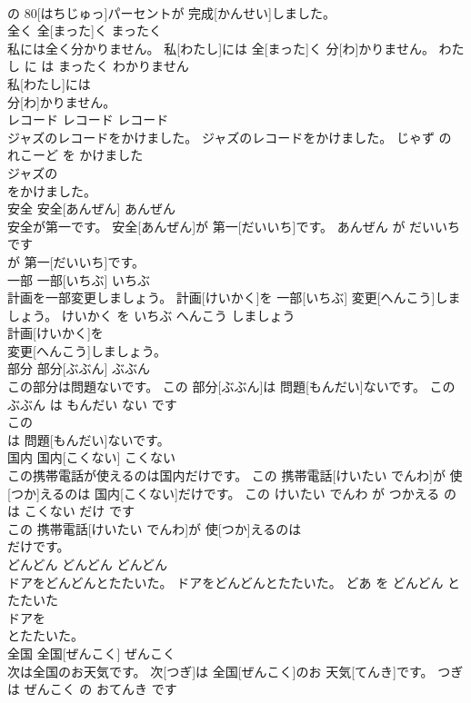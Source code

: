 \documentclass[8pt]{extreport}
\begin{document}
\begin{CJK}{UTF8}{min}
\\	の 80[はちじゅっ]パーセントが 完成[かんせい]しました。		
\\	全く	全[まった]く	まったく	
\\	私には全く分かりません。	私[わたし]には 全[まった]く 分[わ]かりません。	わたし に は まったく わかりません	
\\	私[わたし]には
\\	分[わ]かりません。		
\\	レコード	レコード	レコード	
\\	ジャズのレコードをかけました。	ジャズのレコードをかけました。	じゃず の れこーど を かけました	
\\	ジャズの
\\	をかけました。		
\\	安全	安全[あんぜん]	あんぜん	
\\	安全が第一です。	安全[あんぜん]が 第一[だいいち]です。	あんぜん が だいいち です	
\\	が 第一[だいいち]です。		
\\	一部	一部[いちぶ]	いちぶ	
\\	計画を一部変更しましょう。	計画[けいかく]を 一部[いちぶ] 変更[へんこう]しましょう。	けいかく を いちぶ へんこう しましょう	
\\	計画[けいかく]を
\\	変更[へんこう]しましょう。		
\\	部分	部分[ぶぶん]	ぶぶん	
\\	この部分は問題ないです。	この 部分[ぶぶん]は 問題[もんだい]ないです。	この ぶぶん は もんだい ない です	
\\	この
\\	は 問題[もんだい]ないです。		
\\	国内	国内[こくない]	こくない	
\\	この携帯電話が使えるのは国内だけです。	この 携帯電話[けいたい でんわ]が 使[つか]えるのは 国内[こくない]だけです。	この けいたい でんわ が つかえる の は こくない だけ です	
\\	この 携帯電話[けいたい でんわ]が 使[つか]えるのは
\\	だけです。		
\\	どんどん	どんどん	どんどん	
\\	ドアをどんどんとたたいた。	ドアをどんどんとたたいた。	どあ を どんどん と たたいた	
\\	ドアを
\\	とたたいた。		
\\	全国	全国[ぜんこく]	ぜんこく	
\\	次は全国のお天気です。	次[つぎ]は 全国[ぜんこく]のお 天気[てんき]です。	つぎ は ぜんこく の おてんき です	

\end{CJK}
\end{document}
